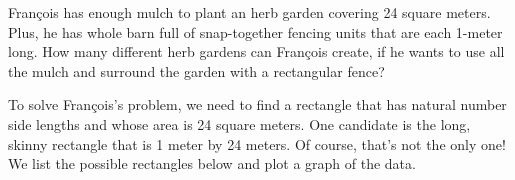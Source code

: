 
\begin{boxexplore}
Fran\c{c}ois has enough mulch to plant an herb garden covering 24 square meters. Plus, he has whole barn full of snap-together fencing units that are each 1-meter long. How many different herb gardens can Fran\c{c}ois create, if he wants to use all the mulch and surround the garden with a rectangular fence?
\end{boxexplore} %


To solve Fran\c{c}ois's problem, we need to find a rectangle that has natural number side lengths and whose area is 24 square meters. One candidate is the long, skinny rectangle that is 1 meter by 24 meters. Of course, that's not the only one! We list the possible rectangles below and plot a graph of the data.

